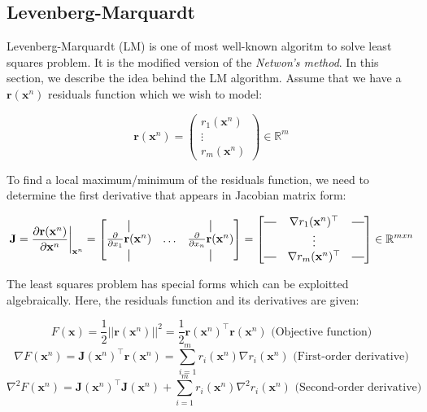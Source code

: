 \documentclass[a4paper]{report}
\numberwithin{figure}{section}
\newcommand{\R}{\mathbb{R}}
\newcommand*{\vertbar}{\rule[-1ex]{0.5pt}{2.5ex}}
\newcommand*{\horzbar}{\rule[.5ex]{2.5ex}{0.5pt}}
\begin{document}
\begin{appendices}
\subsection{Levenberg-Marquardt}
Levenberg-Marquardt (LM) is one of most well-known algoritm 
to solve least squares problem. It is the modified version of the \textit{Netwon's method}. 
In this section, we describe the idea behind 
the LM algorithm. Assume that we have a $\mathbf{r}(\mathbf{x}^n)$ residuals function which we 
wish to model:

\begin{equation}
  \mathbf{r}(\mathbf{x}^n) = \begin{pmatrix} r_1(\mathbf{x}^n) \\ \vdots \\ r_m(\mathbf{x}^n) \end{pmatrix} \in \R^m
\end{equation}

To find a local maximum/minimum of the residuals function, we need to 
determine the first derivative that 
appears in Jacobian matrix form:

\begin{equation}
  \mathbf{J} = \frac{\partial \mathbf{r}(\mathbf{x}^n)}{\partial \mathbf{x}^n } \bigg|_{\mathbf{x}^n}
  = 
  \begin{bmatrix} 
    \vertbar & & \vertbar \\
    \frac{\partial}{\partial x_1}\mathbf{r}(\mathbf{x}^n) & \dots & \frac{\partial}{\partial x_n}\mathbf{r}(\mathbf{x}^n) \\
    \vertbar & & \vertbar
  \end{bmatrix}
  = 
  \begin{bmatrix}
    \horzbar & \nabla r_1(\mathbf{x}^n)^\top & \horzbar \\
     & \vdots & \\
     \horzbar & \nabla r_m(\mathbf{x}^n)^\top & \horzbar 
  \end{bmatrix}
  \in \R^{mxn}
\end{equation}

The least squares problem has special forms which can be exploitted algebraically.
Here, the residuals function and its derivatives are given:

\begin{equation}
  F(\mathbf{x}) = \frac{1}{2} ||\mathbf{r}(\mathbf{x}^n)||^2 = \frac{1}{2} 
  \mathbf{r}(\mathbf{x}^n)^\top \mathbf{r}(\mathbf{x}^n) \text{  
  (Objective 
  function)}
\end{equation}\label{eq:residuals_objective}
\begin{equation}
\nabla F(\mathbf{x}^n) = \mathbf{J}(\mathbf{x}^n)^\top 
\mathbf{r}(\mathbf{x}^n) = 
\sum_{i=1}^{m} r_i(\mathbf{x}^n) \nabla r_i(\mathbf{x}^n) \text{  (First-order 
derivative)}
\end{equation}\label{eq:residuals_objective_first_der}
\begin{equation}
  \nabla^2 F(\mathbf{x}^n) = 
  \mathbf{J}(\mathbf{x}^n)^\top\mathbf{J}(\mathbf{x}^n) + \sum_{i=1}^m 
  r_i(\mathbf{x}^n) \nabla^2 r_i(\mathbf{x}^n) \text{ (Second-order 
  derivative)}
\end{equation}\label{eq:residuals_objective_second_der}



\end{appendices}
\end{document}
